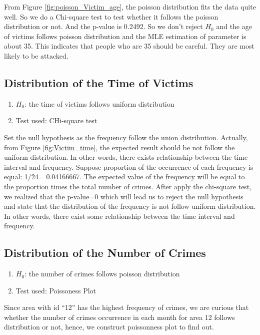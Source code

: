 \documentclass[UTF8]{article}
\begin{document}
From Figure \ref{fig:poisson_Victim_age}, the poisson distribution fits the data quite well. So we do a Chi-square test to test whether it follows the poisson distribution or not. And the p-value is 0.2492. So we don't reject $H_0$ and the age of victims follows poisson distribution and the MLE estimation of parameter is about 35. This indicates that people who are 35 should be careful. They are most likely to be attacked.

\subsection{Distribution of the Time of Victims}

\begin{enumerate}[-]
    \item $H_0$: the time of victims follows uniform distribution
    \item Test used: CHi-square test
\end{enumerate}

Set the null hypothesis as the frequency follow the union distribution. Actually, from Figure \ref{fig:Victim_time}, the expected result should be not follow the uniform distribution. In other words, there exists relationship between the time interval and frequency. Suppose proportion of the occurrence of each frequency is equal: 1/24= 0.04166667. The expected value of the frequency will be equal to the proportion times the total number of crimes. After apply the chi-square test, we realized that the p-value=0 which will lead us to reject the null hypothesis and state that the distribution of the frequency is not follow uniform distribution. In other words, there exist some relationship between the time interval and frequency.

\subsection{Distribution of the Number of Crimes}

\begin{enumerate}[-]
    \item $H_0$: the number of crimes follows poisson distribution
    \item Test used: Poissoness Plot
\end{enumerate}

Since area with id “12” has the highest frequency of crimes, we are curious that whether the number of crimes occurrence in each month for area 12 follows distribution or not, hence, we construct poissonness plot to find out.
\end{document}

